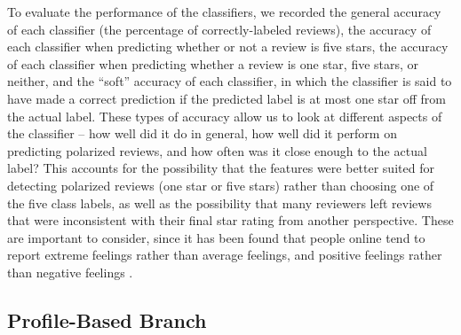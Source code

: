 To evaluate the performance of the classifiers, we recorded the general accuracy of each classifier (the percentage of correctly-labeled reviews), the accuracy of each classifier when predicting whether or not a review is five stars, the accuracy of each classifier when predicting whether a review is one star, five stars, or neither, and the ``soft'' accuracy of each classifier, in which the classifier is said to have made a correct prediction if the predicted label is at most one star off from the actual label. These types of accuracy allow us to look at different aspects of the classifier -- how well did it do in general, how well did it perform on predicting polarized reviews, and how often was it close enough to the actual label? This accounts for the possibility that the features were better suited for detecting polarized reviews (one star or five stars) rather than choosing one of the five class labels, as well as the possibility that many reviewers left reviews that were inconsistent with their final star rating from another perspective. These are important to consider, since it has been found that people online tend to report extreme feelings rather than average feelings, and positive feelings rather than negative feelings \cite{imbalance}.

\subsection{Profile-Based Branch}
